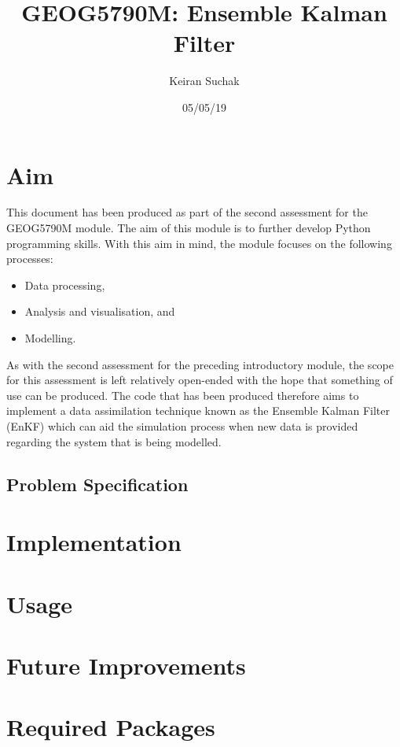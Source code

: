 \documentclass[a4paper, 12pt, twoside]{article}
\begin{document}
\title{GEOG5790M: Ensemble Kalman Filter}
\author{Keiran Suchak}
\date{05/05/19}

\maketitle
\tableofcontents

\newpage
\section{Aim}\label{sec:aim}

This document has been produced as part of the second assessment for the
GEOG5790M module.
The aim of this module is to further develop Python programming skills.
With this aim in mind, the module focuses on the following processes:
\begin{itemize}
    \item Data processing,
    \item Analysis and visualisation, and
    \item Modelling.
\end{itemize}

As with the second assessment for the preceding introductory module, the scope
for this assessment is left relatively open-ended with the hope that something
of use can be produced.
The code that has been produced therefore aims to implement a data assimilation
technique known as the Ensemble Kalman Filter (EnKF) which can aid the
simulation process when new data is provided regarding the system that is being
modelled.

\subsection{Problem Specification}\label{sub:aim:problem}



\section{Implementation}\label{sec:implementation}

\section{Usage}\label{sec:usage}

\section{Future Improvements}\label{sec:improvements}

\newpage
\appendix
\section{Required Packages}\label{sec:requirements}
\end{document}
